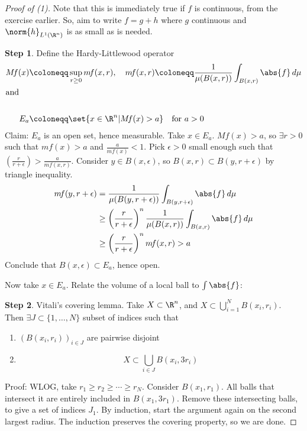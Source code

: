 \documentclass[twoside]{article}
\begin{document}
\begin{proof}[Proof of (1)]
    \newcommand{\mf}{m \! f}
    \newcommand{\Mf}{M \! f}
    Note that this is immediately true if $f$ is continuous, from the exercise earlier. So, aim to write $f = g+h$ where $g$ continuous and $\norm{h}_{L^1(\R^n)}$ is as small as is needed.

    \textbf{Step 1}. Define the Hardy-Littlewood operator
    \begin{align*}
        \Mf(x) &\coloneqq \sup_{r \geq 0}  \mf (x, r), \quad \mf(x, r) \coloneqq \frac{1}{\mu(B(x, r))} \int_{B(x,r)} \abs{f} \, d\mu\\
        \shortintertext{and} \\
        \quad E_a &\coloneqq \set{x \in \R^n | \Mf(x) > a} \quad \text{for } a > 0
    \end{align*}
    Claim: $E_a$ is an open set, hence measurable.
    Take $x \in E_a$. $\Mf(x) > a$, so $\exists r >0$ such that $\mf(x) > a$ and $\frac{a}{\mf(x)} < 1$.
    Pick $\epsilon > 0$ small enough such that $(\frac{r}{r+\epsilon}) > \frac{a}{\mf(x, r)}$. Consider $y \in B(x, \epsilon)$, so $B(x, r) \subset B(y, r + \epsilon)$ by triangle inequality.
    \begin{align*}
        \mf(y, r+\epsilon) &= \frac{1}{\mu(B(y, r+\epsilon))} \int_{B(y, r+\epsilon)} \abs{f} \, d\mu \\
                          &\geq \left(\frac{r}{r+\epsilon}\right)^n \frac{1}{\mu(B(x,r))} \int_{B(x, r)} \abs{f} \, d\mu \\
                          &\geq \left(\frac{r}{r+\epsilon}\right)^n \mf(x, r) > a
    \end{align*}
    Conclude that $B(x, \epsilon) \subset E_a$, hence open.

    Now take $x \in E_a$. Relate the volume of a local ball to $\int \abs{f}$:

    \textbf{Step 2}. Vitali's covering lemma.
    Take $X \subset \R^n$, and $X \subset \bigcup_{i=1}^N B(x_i, r_i)$.  Then $\exists J \subset \{1, \dotsc, N\}$ subset of indices such that
    \begin{enumerate}[label=(\alph*)]
        \item $(B(x_i, r_i))_{i \in J}$ are pairwise disjoint
        \item
            \begin{equation*}
                X \subset \bigcup_{i \in J} B(x_i, 3 r_i)
            \end{equation*}
    \end{enumerate}
    Proof: WLOG, take $r_1 \geq r_2 \geq \dotsb \geq r_N$. Consider $B(x_1, r_1)$. All balls that intersect it are entirely included in $B(x_1, 3 r_1)$. %
    Remove these intersecting balls, to give a set of indices $J_1$. By induction, start the argument again on the second largest radius.
    The induction preserves the covering property, so we are done.


\end{proof}
\end{document}
